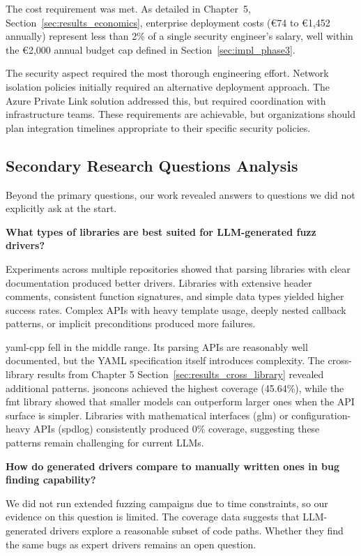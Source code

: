 The cost requirement was met. As detailed in Chapter~5, Section~\ref{sec:results_economics}, enterprise deployment costs (\euro{}74 to \euro{}1,452 annually) represent less than 2\% of a single security engineer's salary, well within the \euro{}2,000 annual budget cap defined in Section~\ref{sec:impl_phase3}.

The security aspect required the most thorough engineering effort. Network isolation policies initially required an alternative deployment approach. The Azure Private Link solution addressed this, but required coordination with infrastructure teams. These requirements are achievable, but organizations should plan integration timelines appropriate to their specific security policies.


\subsection{Secondary Research Questions Analysis}
\label{sec:discussion_rq_secondary}

Beyond the primary questions, our work revealed answers to questions we did not explicitly ask at the start.

\textbf{What types of libraries are best suited for LLM-generated fuzz drivers?}

Experiments across multiple repositories showed that parsing libraries with clear documentation produced better drivers. Libraries with extensive header comments, consistent function signatures, and simple data types yielded higher success rates. Complex APIs with heavy template usage, deeply nested callback patterns, or implicit preconditions produced more failures.

yaml-cpp fell in the middle range. Its parsing APIs are reasonably well documented, but the YAML specification itself introduces complexity. The cross-library results from Chapter 5 Section~\ref{sec:results_cross_library} revealed additional patterns. jsoncons achieved the highest coverage (45.64\%), while the fmt library showed that smaller models can outperform larger ones when the API surface is simpler. Libraries with mathematical interfaces (glm) or configuration-heavy APIs (spdlog) consistently produced 0\% coverage, suggesting these patterns remain challenging for current LLMs.

\textbf{How do generated drivers compare to manually written ones in bug finding capability?}

We did not run extended fuzzing campaigns due to time constraints, so our evidence on this question is limited. The coverage data suggests that LLM-generated drivers explore a reasonable subset of code paths. Whether they find the same bugs as expert drivers remains an open question.

